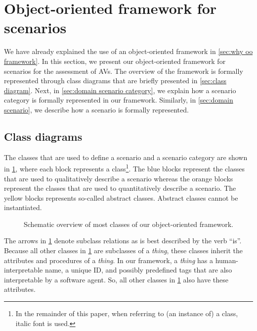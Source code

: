 \cstartb
\section{Object-oriented framework for scenarios}
\label{sec:oo framework}
\cendb

We have already explained the use of an \cstartb object-oriented framework \cendb in \cref{sec:why oo framework}. In this section, we present our \cstartb object-oriented framework \cendb for scenarios for the assessment of AVs. 
The \cstartb overview of the framework \cendb is formally represented through \cstartb class diagrams \cendb that are briefly presented in \cref{sec:class diagram}. Next, in \cref{sec:domain scenario category}, we explain how a scenario category is formally represented \cstartb in our framework\cendb. Similarly, in \cref{sec:domain scenario}, we describe how a scenario is formally represented. 



\cstartb
\subsection{Class diagrams}\cendb
\label{sec:class diagram}

The classes that are used to define a scenario and a scenario category are shown in \cref{fig:class overview}, where each block represents a class\footnote{In the remainder of this paper, when referring to (an instance of) a class, italic font is used.}.
The blue blocks represent the classes that are used to qualitatively describe a scenario whereas the orange blocks represent the classes that are used to quantitatively describe a scenario. \cstartb The yellow blocks represents so-called abstract classes. Abstract classes cannot be instantiated. \cendb

\begin{figure}[t]
	\centering
	
	\caption{\color{red}Schematic overview of most classes of our object-oriented framework.\color{black}}
	\label{fig:class overview}
\end{figure}

The arrows in \cref{fig:class overview} denote subclass relations as is best described by the verb ``is''. Because all other classes in \cref{fig:class overview} are subclasses of a \textit{thing}, these classes inherit the attributes and procedures of a \textit{thing}. In our framework, a \textit{thing} has a human-interpretable name, a unique ID, and possibly predefined tags that are also interpretable by a software agent. So, all other classes in \cref{fig:class overview} also have these attributes. 

